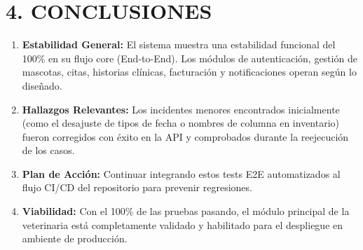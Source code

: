 \documentclass[11pt,a4paper]{article}
\begin{document}
\section*{4. CONCLUSIONES}
\begin{enumerate}
    \item \textbf{Estabilidad General:} El sistema muestra una estabilidad funcional del 100\% en su flujo core (End-to-End). Los módulos de autenticación, gestión de mascotas, citas, historias clínicas, facturación y notificaciones operan según lo diseñado.
    \item \textbf{Hallazgos Relevantes:} Los incidentes menores encontrados inicialmente (como el desajuste de tipos de fecha o nombres de columna en inventario) fueron corregidos con éxito en la API y comprobados durante la reejecución de los casos.
    \item \textbf{Plan de Acción:} Continuar integrando estos tests E2E automatizados al flujo CI/CD del repositorio para prevenir regresiones. 
    \item \textbf{Viabilidad:} Con el 100\% de las pruebas pasando, el módulo principal de la veterinaria está completamente validado y habilitado para el despliegue en ambiente de producción.
\end{enumerate}
\end{document}
